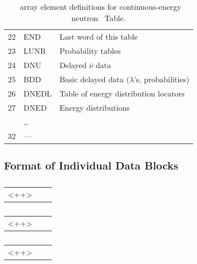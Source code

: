 \begin{table}
\begin{tabular}{rll}
    22       & END    & Last word of this table \\
    23       & LUNR   & Probability tables \\
    24       & DNU    & Delayed $\overline{\nu}$ data \\
    25       & BDD    & Basic delayed data ($\lambda$'s, probabilities) \\
    26       & DNEDL  & Table of energy distribution locators \\
    27       & DNED   & Energy distributions \\
             & \ldots & \\
    32       & ---    & \\
    \bottomrule
  \end{tabular}
  \caption{\JXS\ array element definitions for continuous-energy neutron \ACE\ Table.}
  \label{tab:JXSContinuousEnergyNeutron}
\end{table}

\subsection{Format of Individual Data Blocks}
\begin{table} \centering
  \begin{tabular}{lll}
    <++>
  \end{tabular}
  \caption{}
  \label{tab:ESZBlock}
\end{table}

\begin{table} \centering
  \begin{tabular}{lll}
    <++>
  \end{tabular}
  \caption{}
  \label{tab:NUBlock}
\end{table}

\begin{table} \centering
  \begin{tabular}{lll}
    <++>
  \end{tabular}
  \caption{}
  \label{tab:MTRBlock}
\end{table}

